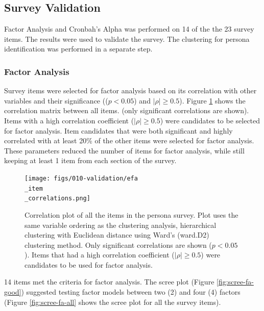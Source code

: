 \documentclass[020-persona\_validation.tex]{subfiles}
\begin{document}
    \subsection{Survey Validation}

        Factor Analysis and Cronbah's Alpha was performed on 14 of the the 23 survey items.
        The results were used to validate the survey.
        The clustering for persona identification was performed in a separate step.

    \subsubsection{Factor Analysis}

        Survey items were selected for factor analysis based on its correlation with other variables and their significance
        (($p < 0.05$) and $\left|\rho\right| \ge 0.5$).
        Figure \ref{fig:persona-item-corr} shows the correlation matrix between all items.
        (only significant correlations are shown).
        Items with a high correlation coefficient ($\left|\rho\right| \ge 0.5$) were candidates to be selected for factor analysis.
        Item candidates that were both significant and highly correlated with at least 20\% of the other items were
        selected for factor analysis.
        These parameters reduced the number of items for factor analysis,
        while still keeping at least 1 item from each section of the survey.

        \begin{figure}[htb!]
            \centering
            \texttt{[image: figs/010-validation/efa\\\_item\\\_correlations.png]}
            \caption[Correlation matrix of persona items]
            {Correlation plot of all the items in the persona survey.
             Plot uses the same variable ordering as the clustering analysis,
             hierarchical clustering with Euclidean distance using Ward's (ward.D2) clustering method.
             Only significant correlations are shown ($p < 0.05$).
             Items that had a high correlation coefficient ($\left|\rho\right| \ge 0.5$)
             were candidates to be used for factor analysis.
            }
            \label{fig:persona-item-corr}
        \end{figure}

        14 items met the criteria for factor analysis.
        The scree plot (Figure \ref{fig:scree-fa-good}) suggested testing factor models between two (2) and four (4) factors
        (Figure \ref{fig:scree-fa-all} shows the scree plot for all the survey items).
\end{document}
